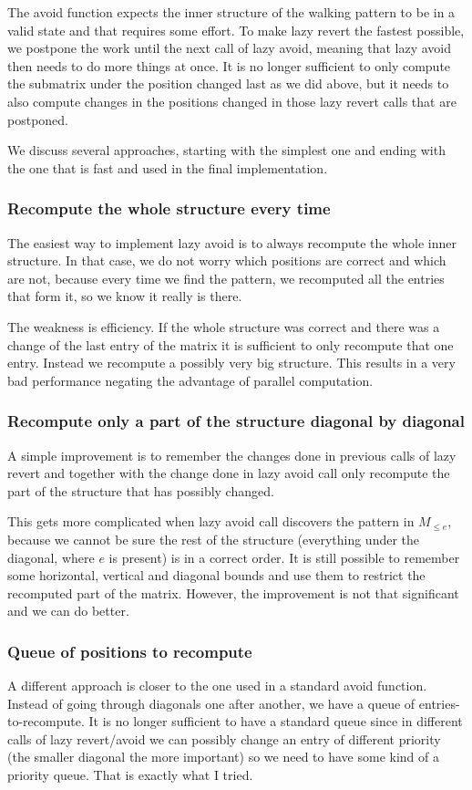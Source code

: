 The avoid function expects the inner structure of the walking pattern to be in a valid state and that requires some effort. To make lazy revert the fastest possible, we postpone the work until the next call of lazy avoid, meaning that lazy avoid then needs to do more things at once. It is no longer sufficient to only compute the submatrix under the position changed last as we did above, but it needs to also compute changes in the positions changed in those lazy revert calls that are postponed.

We discuss several approaches, starting with the simplest one and ending with the one that is fast and used in the final implementation.

\subsubsection{Recompute the whole structure every time}
The easiest way to implement lazy avoid is to always recompute the whole inner structure. In that case, we do not worry which positions are correct and which are not, because every time we find the pattern, we recomputed all the entries that form it, so we know it really is there.

The weakness is efficiency. If the whole structure was correct and there was a change of the last entry of the matrix it is sufficient to only recompute that one entry. Instead we recompute a possibly very big structure. This results in a very bad performance negating the advantage of parallel computation.
\subsubsection{Recompute only a part of the structure diagonal by diagonal}
A simple improvement is to remember the changes done in previous calls of lazy revert and together with the change done in lazy avoid call only recompute the part of the structure that has possibly changed.

This gets more complicated when lazy avoid call discovers the pattern in $M_{\leq e}$, because we cannot be sure the rest of the structure (everything under the diagonal, where $e$ is present) is in a correct order. It is still possible to remember some horizontal, vertical and diagonal bounds and use them to restrict the recomputed part of the matrix. However, the improvement is not that significant and we can do better.
\subsubsection{Queue of positions to recompute}
A different approach is closer to the one used in a standard avoid function. Instead of going through diagonals one after another, we have a queue of entries-to-recompute. It is no longer sufficient to have a standard queue since in different calls of lazy revert/avoid we can possibly change an entry of different priority (the smaller diagonal the more important) so we need to have some kind of a priority queue. That is exactly what I tried.

